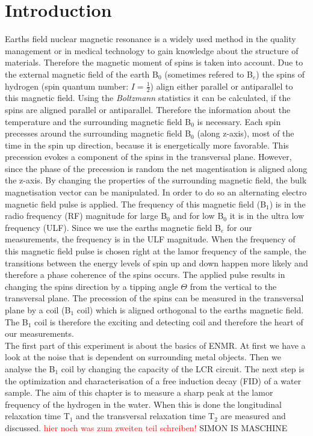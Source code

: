 \section{Introduction}
\label{sec:Introduction}
Earths field nuclear magnetic resonance is a widely used method in the quality management or in medical technology to gain knowledge about the structure of materials. Therefore the magnetic moment of spins is taken into account.\newline
Due to the external magnetic field of the earth B$_0$ (sometimes refered to B$_e$) the spins of hydrogen (spin quantum number: $I=\frac{1}{2}$) align either parallel or antiparallel to this magnetic field. Using the \textit{Boltzmann} statistics it can be calculated, if the spins are aligned parallel or antiparallel. Therefore the information about the temperature and the surrounding magnetic field B$_0$ is necessary. Each spin precesses around the surrounding magnetic field B$_0$ (along z-axis), most of the time in the spin up direction, because it is energetically more favorable. This precession evokes a component of the spins in the transversal plane. However, since the phase of the precession is random the net magentisation is aligned along the z-axis. By changing the properties of the surrounding magnetic field, the bulk magnetisation vector can be manipulated. In order to do so an alternating electro magnetic field pulse is applied. The frequency of this magnetic field (B$_1$) is in the radio frequency (RF) magnitude for large B$_0$ and for low B$_0$ it is in the ultra low frequency (ULF). Since we use the earths magnetic field B$_e$ for our measurements, the frequency is in the ULF magnitude. When the frequency of this magnetic field pulse is chosen right at the lamor frequency of the sample, the transitions between the energy levels of spin up and down happen more likely and therefore a phase coherence of the spins occurs. The applied pulse results in changing the spins direction by a tipping angle $\Theta$ from the vertical to the transversal plane. The precession of the spins can be measured in the transversal plane by a coil (B$_1$ coil) which is aligned orthogonal to the earths magnetic field. The B$_1$ coil is therefore the exciting and detecting coil and therefore the heart of our measurements. \\
The first part of this experiment is about the basics of ENMR. At first we have a look at the noise that is dependent on surrounding metal objects. Then we analyse the B$_1$ coil by changing the capacity of the LCR circuit. The next step is the optimization and characterisation of a free induction decay (FID) of a water sample. The aim of this chapter is to measure a sharp peak at the lamor frequency of the hydrogen in the water. When this is done the longitudinal relaxation time T$_1$ and the transversal relaxation time T$_2$ are measured and discussed.
\textcolor{red}{hier noch was zum zweiten teil schreiben!}
SIMON IS MASCHINE
